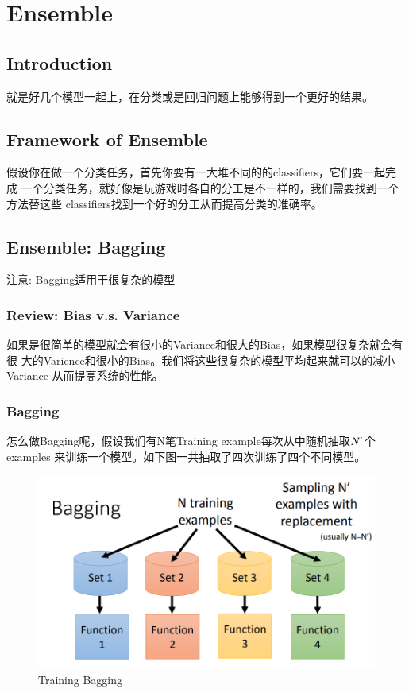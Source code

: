 \chapter{Ensemble}
\section{Introduction}
就是好几个模型一起上，在分类或是回归问题上能够得到一个更好的结果。

\section{Framework of Ensemble}
假设你在做一个分类任务，首先你要有一大堆不同的的classifiers，它们要一起完成
一个分类任务，就好像是玩游戏时各自的分工是不一样的，我们需要找到一个方法替这些
classifiers找到一个好的分工从而提高分类的准确率。

\section{Ensemble: Bagging}
注意: Bagging适用于很复杂的模型
\subsection{Review: Bias v.s. Variance}
如果是很简单的模型就会有很小的Variance和很大的Bias，如果模型很复杂就会有很
大的Varience和很小的Bias。我们将这些很复杂的模型平均起来就可以的减小Variance
从而提高系统的性能。
\subsection{Bagging}
怎么做Bagging呢，假设我们有N笔Training example每次从中随机抽取$N^`$个examples
来训练一个模型。如下图一共抽取了四次训练了四个不同模型。
\begin{figure}[H]
    \centerline{\includegraphics[scale=0.3]{Part1/Chapter/images/bagging1.png}}
    \caption{Training Bagging}
\end{figure}

